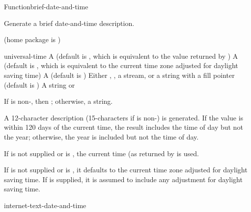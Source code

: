 \documentclass[10pt,twoside,english,pdftex]{article}
\begin{document}

\begin{functiondoc}{Function}{brief-date-and-time}{%
     
     
    \returns{} }
% 
% 

\fnsyntax

\fnpurpose Generate a brief date-and-time description.

\fnpackage {} (home package is )

\fnmodule {}

\fnargs
\begin{args}{universal-time}
 A  (default is \nil,
  which is equivalent to the value returned by
  )
 A  (default is \nil,
  which is equivalent to the current time zone adjusted for daylight
  saving time)
 A  (default is \nil)
\arg[destination] Either \nil, , a stream, or a string with a fill 
pointer (default is \nil)
\arg[result] A string or \nil{}
\end{args}

\fnreturns If  is non-\nil, then \nil; otherwise, a string.

\fndescription A 12-character description (15-characters if
 is non-\nil{}) is generated.  If the
 value is within 120 days of the current time,
the result  includes the time of day but not the year;
otherwise, the year is included but not the time of day.

\W{} 
%
%
If  is not supplied or is \nil, the current time
(as returned by  is used.

\W{} 
%
If  is not supplied or is \nil, it defaults to the
current time zone adjusted for daylight saving time. If
 is supplied, it is assumed to include any adjustment
for daylight saving time.

\begin{alsos}{internet-text-date-and-time}
\end{alsos}


\end{functiondoc}
\end{document}
